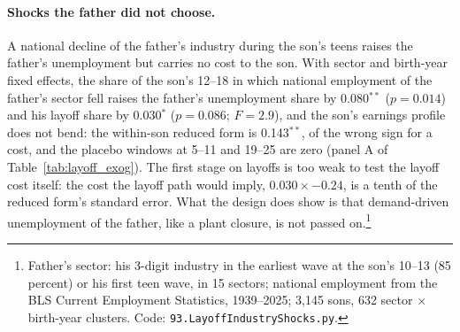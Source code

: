 \paragraph{Shocks the father did not choose.} A national decline of the father's industry during the son's teens raises
the father's unemployment but carries no cost to the son. With sector and birth-year fixed effects, the share of the
son's 12--18 in which national employment of the father's sector fell raises the father's unemployment share by
0.080$^{**}$ ($p = 0.014$) and his layoff share by 0.030$^{*}$ ($p = 0.086$; $F = 2.9$), and the son's earnings profile
does not bend: the within-son reduced form is 0.143$^{**}$, of the wrong sign for a cost, and the placebo windows at
5--11 and 19--25 are zero (panel A of Table~\ref{tab:layoff_exog}). The first stage on layoffs is too weak to test the
layoff cost itself: the cost the layoff path would imply, $0.030 \times -0.24$, is a tenth of the reduced form's
standard error. What the design does show is that demand-driven unemployment of the father, like a plant closure, is
not passed on.\footnote{Father's sector: his 3-digit industry in the earliest wave at the son's 10--13 (85 percent) or
his first teen wave, in 15 sectors; national employment from the BLS Current Employment Statistics, 1939--2025; 3,145
sons, 632 sector $\times$ birth-year clusters. Code: \texttt{93.LayoffIndustryShocks.py}.}

